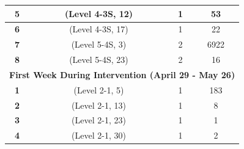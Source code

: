 \begin{table}
\begin{tabular}{cccc}
\textbf{5}              & (Level 4-3S, 12)                                                                     & 1                                                                           & 53                                                                             \\ \hline
\textbf{6}              & (Level 4-3S, 17)                                                                     & 1                                                                           & 22                                                                             \\ \hline
\textbf{7}              & (Level 5-4S, 3)                                                                      & 2                                                                           & 6922                                                                           \\ \hline
\textbf{8}              & (Level 5-4S, 23)                                                                     & 2                                                                           & 16                                                                             \\ \hline
\multicolumn{4}{c}{\cellcolor[HTML]{ECF4FF}\textbf{First Week During Intervention (April 29 - May 26)}}                                                                                                                                                             \\ \hline
\textbf{1}              & (Level 2-1, 5)                                                                      & 1                                                                           & 183                                                                            \\ \hline
\textbf{2}              & (Level 2-1, 13)                                                                     & 1                                                                           & 8                                                                              \\ \hline
\textbf{3}              & (Level 2-1, 23)                                                                     & 1                                                                           & 1                                                                              \\ \hline
\textbf{4}              & (Level 2-1, 30)                                                                     & 1                                                                           & 2                                                                              \\ \hline

\end{tabular}
\end{table}
